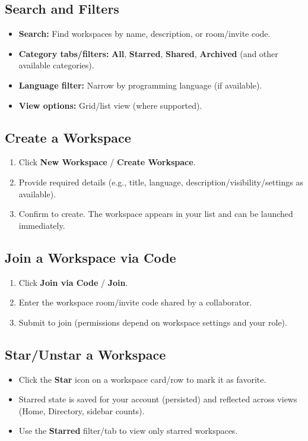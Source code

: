 \documentclass[11pt,a4paper]{article}
\begin{document}
\subsection{Search and Filters}
\begin{itemize}
  \item \textbf{Search:} Find workspaces by name, description, or room/invite code.
  \item \textbf{Category tabs/filters:} \textbf{All}, \textbf{Starred}, \textbf{Shared}, \textbf{Archived} (and other available categories).
  \item \textbf{Language filter:} Narrow by programming language (if available).
  \item \textbf{View options:} Grid/list view (where supported).
\end{itemize}

\subsection{Create a Workspace}
\begin{enumerate}
  \item Click \textbf{New Workspace} / \textbf{Create Workspace}.
  \item Provide required details (e.g., title, language, description/visibility/settings as available).
  \item Confirm to create. The workspace appears in your list and can be launched immediately.
\end{enumerate}

\subsection{Join a Workspace via Code}
\begin{enumerate}
  \item Click \textbf{Join via Code} / \textbf{Join}.
  \item Enter the workspace room/invite code shared by a collaborator.
  \item Submit to join (permissions depend on workspace settings and your role).
\end{enumerate}

\subsection{Star/Unstar a Workspace}
\begin{itemize}
  \item Click the \textbf{Star} icon on a workspace card/row to mark it as favorite.
  \item Starred state is saved for your account (persisted) and reflected across views (Home, Directory, sidebar counts).
  \item Use the \textbf{Starred} filter/tab to view only starred workspaces.
\end{itemize}
\end{document}
